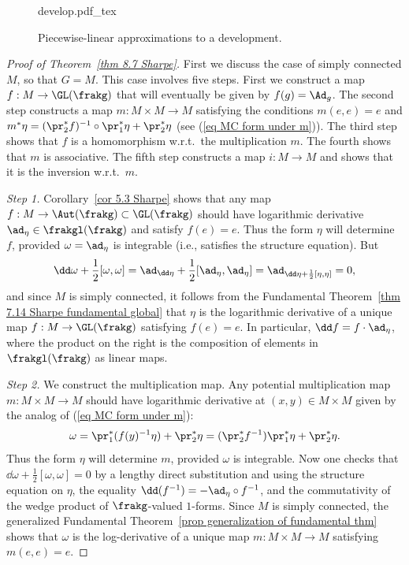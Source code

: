 \begin{figure}[tp]
    \def\svgwidth{0.5\linewidth}
    \centering
    {develop.pdf_tex}
    \caption{Piecewise-linear approximations to a development.\label{fig:develop}}
\end{figure}

\begin{proof}[Proof of Theorem~\ref{thm 8.7 Sharpe}]
    First we discuss the case of simply connected $M$, so that $G=M$. This case involves five steps. First we construct a map $f:M\to \GL(\frakg)$ that will eventually be given by $f(g)=\Ad_g$. The second step constructs a map $m:M\times M\to M$ satisfying the conditions $m(e,e)=e$ and $m^\ast \eta=(\pr_2^\ast f)^{-1} \circ \pr_1^\ast\eta+\pr_2^\ast\eta$ (see (\ref{eq MC form under m})). The third step shows that $f$ is a homomorphism w.r.t.\ the multiplication $m$. The fourth shows that $m$ is associative. The fifth step constructs a map $i:M\to M$ and shows that it is the inversion w.r.t.\ $m$.

    \emph{Step 1.} Corollary~\ref{cor 5.3 Sharpe} shows that any map $f:M\to \Aut(\frakg)\subset \GL(\frakg)$ should have logarithmic derivative $\ad_{\eta}\in \frakgl(\frakg)$ and satisfy $f(e)=e$. Thus the form $\eta$ will determine $f$, provided $\omega=\ad_\eta$ is integrable (i.e., satisfies the structure equation). But
    \[\dd\omega+\frac12[\omega,\omega]=\ad_{\dd\eta}+\frac12[\ad_\eta,\ad_\eta]=\ad_{\dd\eta+\frac12[\eta,\eta]}=0,\]
    and since $M$ is simply connected, it follows from the Fundamental Theorem~\ref{thm 7.14 Sharpe fundamental global} that $\eta$ is the logarithmic derivative of a unique map $f:M\to \GL(\frakg)$ satisfying $f(e)=e$. In particular, $\dd f=f\cdot \ad_\eta$, where the product on the right is the composition of elements in $\frakgl(\frakg)$ as linear maps.

    \emph{Step 2.} We construct the multiplication map. Any potential multiplication map $m:M\times M\to M$ should have logarithmic derivative at $(x,y)\in M\times M$ given by the analog of (\ref{eq MC form under m}):
    \[\omega=\pr_1^\ast (f(y)^{-1}\eta)+\pr_2^\ast\eta=(\pr_2^\ast f^{-1})\pr_1^\ast\eta+\pr_2^\ast\eta.\]
    Thus the form $\eta$ will determine $m$, provided $\omega$ is integrable. Now one checks that $\dd\omega+\frac12[\omega,\omega]=0$ by a lengthy direct substitution and using the structure equation on $\eta$, the equality $\dd (f^{-1})=-\ad_\eta\circ f^{-1}$, and the commutativity of the wedge product of $\frakg$-valued $1$-forms. Since $M$ is simply connected, the generalized Fundamental Theorem~\ref{prop generalization of fundamental thm} shows that $\omega$ is the log-derivative of a unique map $m:M\times M\to M$ satisfying $m(e,e)=e$.


\end{proof}
